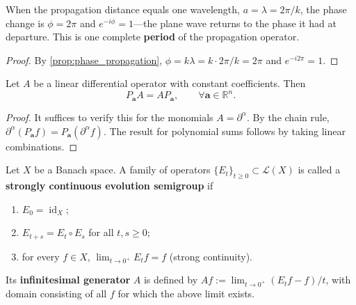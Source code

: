 \begin{corollary}\label{cor:propagation_period_closure}
When the propagation distance equals one wavelength, $a = \lambda = 2\pi/k$, the phase change is $\phi = 2\pi$ and $e^{-i\phi}=1$---the plane wave returns to the phase it had at departure. This is one complete \textbf{period} of the propagation operator.
\end{corollary}

\begin{proof}
By \cref{prop:phase_propagation}, $\phi = k\lambda = k\cdot 2\pi/k = 2\pi$ and $e^{-i2\pi}=1$.
\end{proof}

\begin{proposition}\label{prop:propagation_commutes_translation}
Let $A$ be a linear differential operator with constant coefficients. Then
\[
P_{\mathbf{a}}A = A P_{\mathbf{a}}, \qquad \forall \mathbf{a}\in\mathbb{R}^n.
\]
\end{proposition}

\begin{proof}
It suffices to verify this for the monomials $A = \partial^\alpha$. By the chain rule, $\partial^\alpha(P_{\mathbf{a}}f) = P_{\mathbf{a}}(\partial^\alpha f)$. The result for polynomial sums follows by taking linear combinations.
\end{proof}

\begin{definition}\label{def:evolution_semigroup}
Let $X$ be a Banach space. A family of operators $\{E_t\}_{t\ge 0}\subset\mathcal{L}(X)$ is called a \textbf{strongly continuous evolution semigroup} if
\begin{enumerate}[label=(\roman*)]
    \item $E_0 = \operatorname{id}_X$;
    \item $E_{t+s} = E_t\circ E_s$ for all $t,s\ge 0$;
    \item for every $f\in X$, $\lim_{t\to 0^+}E_t f = f$ (strong continuity).
\end{enumerate}
Its \textbf{infinitesimal generator} $A$ is defined by $Af := \lim_{t\to 0^+}(E_t f - f)/t$, with domain consisting of all $f$ for which the above limit exists.
\end{definition}

